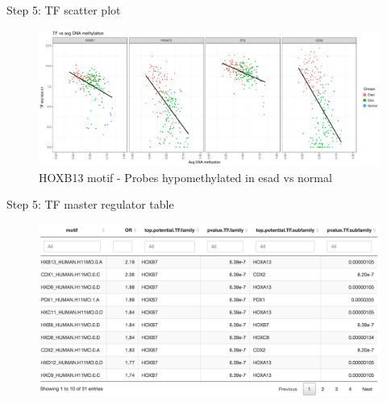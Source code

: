 \documentclass[slidestop,compress,11pt,xcolor=dvipsnames]{beamer}
\begin{document}
\begin{frame}{Step 5: TF scatter plot}
 \begin{figure}
  \centering
  \includegraphics[width=1.0\linewidth]{ELMER/TF_plot_scatter.png}{\tiny{\\HOXB13 motif - Probes hypomethylated in esad vs normal}}
 \end{figure}
\end{frame}

\begin{frame}{Step 5: TF master regulator table}
 \begin{figure}
  \centering
  \includegraphics[width=1.0\linewidth]{ELMER/TF_tbl.png}
 \end{figure}
\end{frame}
\end{document}
